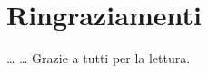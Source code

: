 \chapter*{Ringraziamenti}
\dots \newline
\dots \newline
%
\newline
\newline
%
Grazie a tutti per la lettura. 